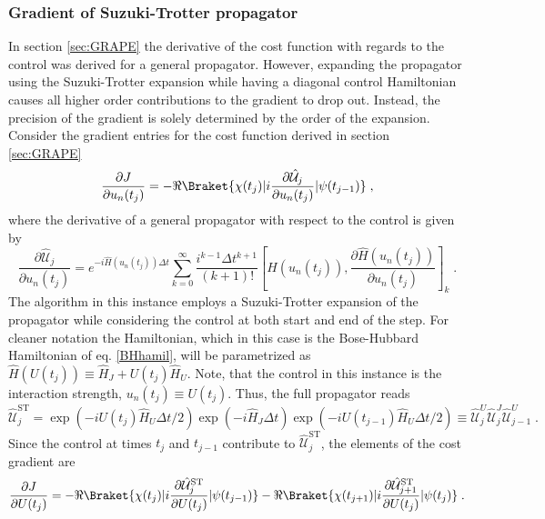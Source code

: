 \subsubsection{Gradient of Suzuki-Trotter propagator}
In section \ref{sec:GRAPE} the derivative of the cost function with regards to the control was derived for a general propagator. However, expanding the propagator using the Suzuki-Trotter expansion while having a diagonal control Hamiltonian causes all higher order contributions to the gradient to drop out. Instead, the precision of the gradient is solely determined by the order of the expansion.\\
Consider the gradient entries for the cost function derived in section \ref{sec:GRAPE}
\begin{equation}
	\frac{\partial J}{\partial u_n (t_j)} = - \Re \Braket{\chi (t_j) | i \frac{ \partial \hat{\mathcal{U}}_{j}}{\partial u_n (t_j)} | \psi (t_{j-1})} \; ,
\end{equation}
where the derivative of a general propagator with respect to the control is given by
\begin{equation}
	\frac{\partial \hat{\mathcal{U}}_{j}}{\partial u_n (t_j)} = e^{-i \hat{H} (u_n (t_j)) \Delta t}  \sum_{k = 0}^{\infty }  \frac{i^{k-1} \Delta t^{k+1}}{(k+1)!} \left[ \hat{H} (u_n (t_j)) , \frac{\partial \hat{H} (u_n (t_j))}{\partial u_n (t_j)}  \right]_k \;.
\end{equation}
The algorithm in this instance employs a Suzuki-Trotter expansion of the propagator while considering the control at both start and end of the step. For cleaner notation the Hamiltonian, which in this case is the Bose-Hubbard Hamiltonian of eq. \eqref{BHhamil}, will be parametrized as $\hat{H}(U(t_j)) \equiv \hat{H}_J + U(t_j) \hat{H}_U$. Note, that the control in this instance is the interaction strength, $u_n (t_j) \equiv U (t_j)$. Thus, the full propagator reads
\begin{equation}
	\hat{\mathcal{U}}_{j}^{\mathrm{ST}} = \exp \left( -i U(t_j) \hat{H}_U \Delta t /2 \right) \exp \left( -i \hat{H}_J \Delta t \right) \exp \left( -i  U(t_{j-1}) \hat{H}_U  \Delta t /2 \right)  \equiv \hat{\mathcal{U}}_{j}^{U} \hat{\mathcal{U}}_{j}^{J} \hat{\mathcal{U}}_{j-1}^{U} \; .
\end{equation}
Since the control at times $t_j$ and $t_{j-1}$ contribute to $\hat{\mathcal{U}}_{j}^{\mathrm{ST}}$, the elements of the cost gradient are
\begin{equation}
	\frac{\partial J}{\partial U (t_j)} = - \Re \Braket{\chi (t_j) | i  \frac{\partial \hat{\mathcal{U}}_{j}^{\mathrm{ST}}}{\partial U (t_j)} | \psi (t_{j-1})} - \Re \Braket{\chi (t_{j+1}) | i \frac{ \partial \hat{\mathcal{U}}_{j+1}^{\mathrm{ST}}}{\partial U (t_j)} | \psi (t_{j})} \; . \label{eq:STcostderiv}
\end{equation}
